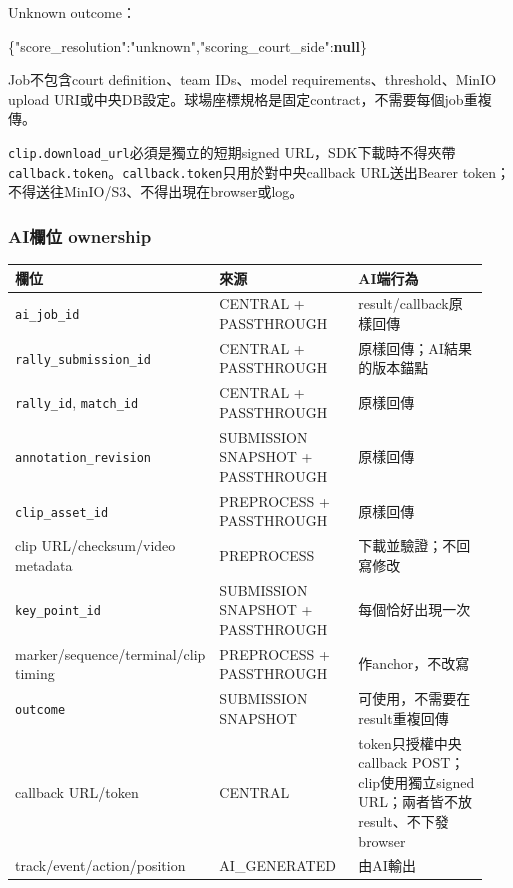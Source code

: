 \documentclass[
  9pt,
  a4paper,
]{article}
\newenvironment{Shaded}{}{}
\newcommand{\DataTypeTok}[1]{\textcolor[rgb]{0.56,0.13,0.00}{#1}}
\newcommand{\FunctionTok}[1]{\textcolor[rgb]{0.02,0.16,0.49}{#1}}
\newcommand{\KeywordTok}[1]{\textcolor[rgb]{0.00,0.44,0.13}{\textbf{#1}}}
\newcommand{\StringTok}[1]{\textcolor[rgb]{0.25,0.44,0.63}{#1}}
\begin{document}
Unknown outcome：

\begin{Shaded}
\begin{Highlighting}[]
\FunctionTok{\{}\DataTypeTok{"score\_\allowbreak{}resolution"}\FunctionTok{:}\StringTok{"unknown"}\FunctionTok{,}\DataTypeTok{"scoring\_\allowbreak{}court\_\allowbreak{}side"}\FunctionTok{:}\KeywordTok{null}\FunctionTok{\}}
\end{Highlighting}
\end{Shaded}

Job不包含court definition、team IDs、model
requirements、threshold、MinIO upload
URI或中央DB設定。球場座標規格是固定contract，不需要每個job重複傳。

\texttt{clip.download\_\allowbreak{}url}必須是獨立的短期signed
URL，SDK下載時不得夾帶\texttt{callback.token}。\texttt{callback.token}只用於對中央callback
URL送出Bearer token；不得送往MinIO/S3、不得出現在browser或log。

\subsubsection{AI欄位 ownership}\label{aiux6b04ux4f4d-ownership}

\begin{longtable}[]{@{}>{\RaggedRight\arraybackslash}p{0.18\linewidth}>{\RaggedRight\arraybackslash}p{0.34\linewidth}>{\RaggedRight\arraybackslash}p{0.42\linewidth}@{}}
\toprule\noalign{}
欄位 & 來源 & AI端行為 \\
\midrule\noalign{}
\endhead
\bottomrule\noalign{}
\endlastfoot
\texttt{ai\_\allowbreak{}job\_\allowbreak{}id} & CENTRAL + PASSTHROUGH &
result/callback原樣回傳 \\
\texttt{rally\_\allowbreak{}submission\_\allowbreak{}id} & CENTRAL + PASSTHROUGH &
原樣回傳；AI結果的版本錨點 \\
\texttt{rally\_\allowbreak{}id}, \texttt{match\_\allowbreak{}id} & CENTRAL + PASSTHROUGH &
原樣回傳 \\
\texttt{annotation\_\allowbreak{}revision} & SUBMISSION SNAPSHOT + PASSTHROUGH &
原樣回傳 \\
\texttt{clip\_\allowbreak{}asset\_\allowbreak{}id} & PREPROCESS + PASSTHROUGH & 原樣回傳 \\
clip URL/checksum/video metadata & PREPROCESS &
下載並驗證；不回寫修改 \\
\texttt{key\_\allowbreak{}point\_\allowbreak{}id} & SUBMISSION SNAPSHOT + PASSTHROUGH &
每個恰好出現一次 \\
marker/sequence/terminal/clip timing & PREPROCESS + PASSTHROUGH &
作anchor，不改寫 \\
\texttt{outcome} & SUBMISSION SNAPSHOT &
可使用，不需要在result重複回傳 \\
callback URL/token & CENTRAL & token只授權中央callback
POST；clip使用獨立signed URL；兩者皆不放result、不下發browser \\
track/event/action/position & AI\_\allowbreak{}GENERATED & 由AI輸出 \\
\end{longtable}
\end{document}
